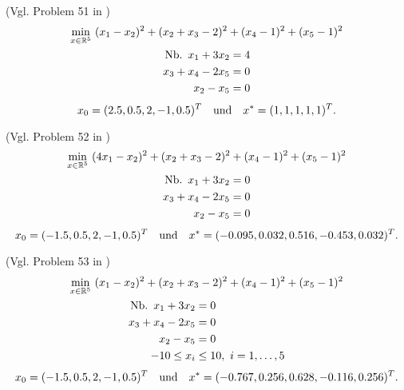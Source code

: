 \begin{testproblem}
(Vgl. Problem 51 in \cite[S.~74]{hock})
\begin{gather}
\min_{x\in\R^5}\ (x_1 - x_2)^2 + (x_2 + x_3 - 2)^2 + (x_4 - 1)^2 + (x_5 - 1)^2 \notag \\
\begin{split}
\nb x_1 + 3 x_2 & = 4 \\
x_3 + x_4 - 2 x_5 & = 0 \\
x_2 - x_5 & = 0 \\
\end{split}
\end{gather}
\begin{equation*}
x_0 = (2.5, 0.5, 2, -1, 0.5)^T \quad\text{und}\quad x^* = (1, 1, 1, 1, 1)^T.
\end{equation*}
\end{testproblem}

\begin{testproblem}
(Vgl. Problem 52 in \cite[S.~75]{hock})
\begin{gather}
\min_{x\in\R^5}\ (4 x_1 - x_2)^2 + (x_2 + x_3 - 2)^2 + (x_4 - 1)^2 + (x_5 - 1)^2 \notag \\
\begin{split}
\nb x_1 + 3 x_2 & = 0 \\
x_3 + x_4 - 2 x_5 & = 0 \\
x_2 - x_5 & = 0 \\
\end{split}
\end{gather}
\begin{equation*}
x_0 = (-1.5, 0.5, 2, -1, 0.5)^T \quad\text{und}\quad x^* = (-0.095, 0.032, 0.516, -0.453, 0.032)^T.
\end{equation*}
\end{testproblem}

\begin{testproblem}
(Vgl. Problem 53 in \cite[S.~76]{hock})
\begin{gather}
\min_{x\in\R^5}\ (x_1 - x_2)^2 + (x_2 + x_3 - 2)^2 + (x_4 - 1)^2 + (x_5 - 1)^2 \notag \\
\begin{split}
\nb x_1 + 3 x_2 & = 0 \\
x_3 + x_4 - 2 x_5 & = 0 \\
x_2 - x_5 & = 0 \\
-10 \leq x_i & \leq 10,\ i = 1,\ldots,5 \\
\end{split}
\end{gather}
\begin{equation*}
x_0 = (-1.5, 0.5, 2, -1, 0.5)^T \quad\text{und}\quad x^* = (-0.767, 0.256, 0.628, -0.116, 0.256)^T.
\end{equation*}
\end{testproblem}

